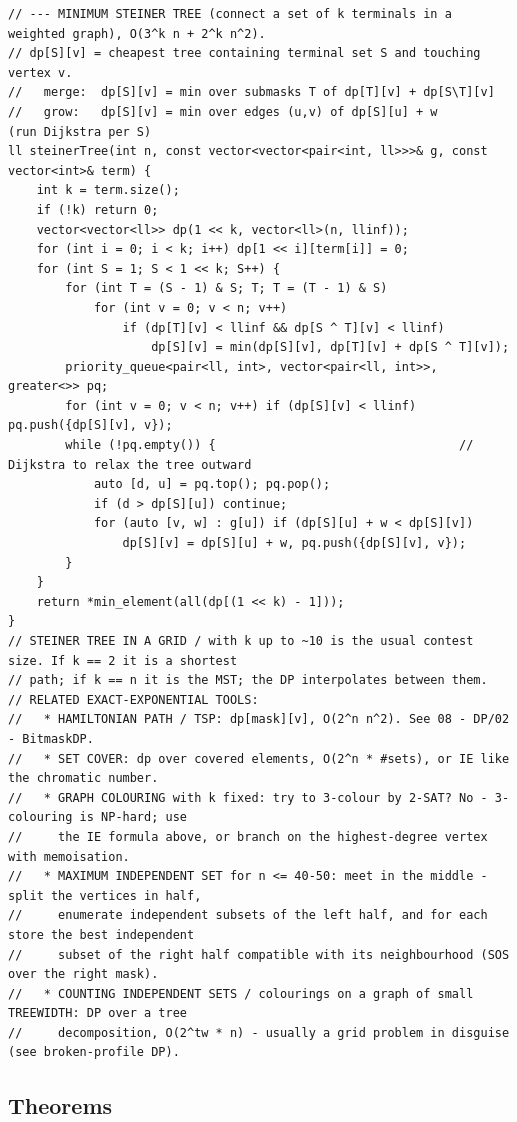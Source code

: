 \documentclass[9pt,a4paper,twocolumn]{extarticle}
\begin{document}
\begin{lstlisting}
// --- MINIMUM STEINER TREE (connect a set of k terminals in a weighted graph), O(3^k n + 2^k n^2).
// dp[S][v] = cheapest tree containing terminal set S and touching vertex v.
//   merge:  dp[S][v] = min over submasks T of dp[T][v] + dp[S\T][v]
//   grow:   dp[S][v] = min over edges (u,v) of dp[S][u] + w         (run Dijkstra per S)
ll steinerTree(int n, const vector<vector<pair<int, ll>>>& g, const vector<int>& term) {
    int k = term.size();
    if (!k) return 0;
    vector<vector<ll>> dp(1 << k, vector<ll>(n, llinf));
    for (int i = 0; i < k; i++) dp[1 << i][term[i]] = 0;
    for (int S = 1; S < 1 << k; S++) {
        for (int T = (S - 1) & S; T; T = (T - 1) & S)
            for (int v = 0; v < n; v++)
                if (dp[T][v] < llinf && dp[S ^ T][v] < llinf)
                    dp[S][v] = min(dp[S][v], dp[T][v] + dp[S ^ T][v]);
        priority_queue<pair<ll, int>, vector<pair<ll, int>>, greater<>> pq;
        for (int v = 0; v < n; v++) if (dp[S][v] < llinf) pq.push({dp[S][v], v});
        while (!pq.empty()) {                                  // Dijkstra to relax the tree outward
            auto [d, u] = pq.top(); pq.pop();
            if (d > dp[S][u]) continue;
            for (auto [v, w] : g[u]) if (dp[S][u] + w < dp[S][v])
                dp[S][v] = dp[S][u] + w, pq.push({dp[S][v], v});
        }
    }
    return *min_element(all(dp[(1 << k) - 1]));
}
// STEINER TREE IN A GRID / with k up to ~10 is the usual contest size. If k == 2 it is a shortest
// path; if k == n it is the MST; the DP interpolates between them.
// RELATED EXACT-EXPONENTIAL TOOLS:
//   * HAMILTONIAN PATH / TSP: dp[mask][v], O(2^n n^2). See 08 - DP/02 - BitmaskDP.
//   * SET COVER: dp over covered elements, O(2^n * #sets), or IE like the chromatic number.
//   * GRAPH COLOURING with k fixed: try to 3-colour by 2-SAT? No - 3-colouring is NP-hard; use
//     the IE formula above, or branch on the highest-degree vertex with memoisation.
//   * MAXIMUM INDEPENDENT SET for n <= 40-50: meet in the middle - split the vertices in half,
//     enumerate independent subsets of the left half, and for each store the best independent
//     subset of the right half compatible with its neighbourhood (SOS over the right mask).
//   * COUNTING INDEPENDENT SETS / colourings on a graph of small TREEWIDTH: DP over a tree
//     decomposition, O(2^tw * n) - usually a grid problem in disguise (see broken-profile DP).
\end{lstlisting}

\subsection{Theorems}
\end{document}
